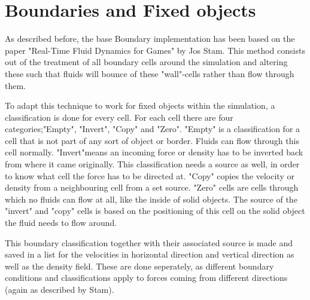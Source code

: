 \chapter{Boundaries and Fixed objects}

As described before, the base Boundary implementation has been based on the paper "Real-Time Fluid Dynamics for Games" by Jos Stam. This method consists out of the treatment of all boundary cells around the simulation and altering these such that fluids will bounce of these "wall"-cells rather than flow through them. 

To adapt this technique to work for fixed objects within the simulation, a classification is done for every cell. For each cell there are four categories;"Empty", "Invert", "Copy" and "Zero". "Empty" is a classification for a cell that is not part of any sort of object or border. Fluids can flow through this cell normally. "Invert"means an incoming force or density has to be inverted back from where it came originally. This classification needs a source as well, in order to know what cell the force has to be directed at. "Copy" copies the velocity or density from a neighbouring cell from a set source. "Zero" cells are cells through which no fluids can flow at all, like the inside of solid objects. The source of the "invert" and "copy" cells is based on the positioning of this cell on the solid object the fluid needs to flow around. 

This boundary classification together with their associated source is made and saved in a list for the velocities in horizontal direction and vertical direction as well as the density field. These are done seperately, as different boundary conditions and classifications apply to forces coming from different directions (again as described by Stam). 

